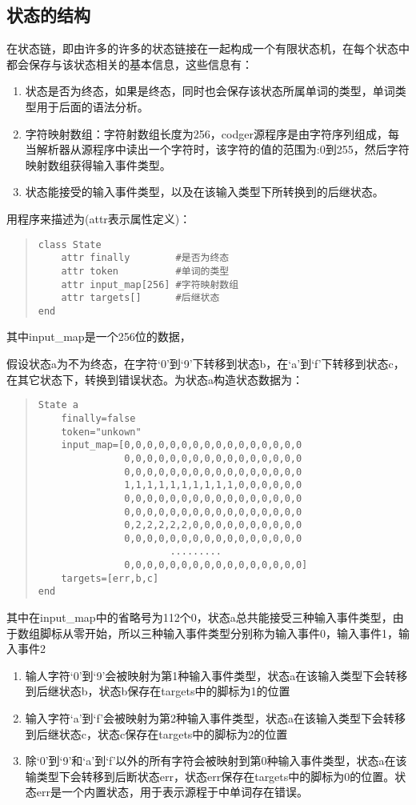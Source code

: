 \documentclass[a4paper,11pt]{article}
\begin{document}
\begin{CJK}{UTF8}{gbsn}
\subsection{状态的结构}
在状态链，即由许多的许多的状态链接在一起构成一个有限状态机，在每个状态中都会保存与该状态相关的基本信息，这些信息有：
\begin{enumerate}
 \item 状态是否为终态，如果是终态，同时也会保存该状态所属单词的类型，单词类型用于后面的语法分析。
 \item 字符映射数组：字符射数组长度为256，codger源程序是由字符序列组成，每当解析器从源程序中读出一个字符时，该字符的值的范围为:0到255，然后字符映射数组获得输入事件类型。
 \item 状态能接受的输入事件类型，以及在该输入类型下所转换到的后继状态。
\end{enumerate}
用程序来描述为(attr表示属性定义)：
\begin{quote}
 \begin{verbatim}
class State
    attr finally        #是否为终态
    attr token          #单词的类型
    attr input_map[256] #字符映射数组
    attr targets[]      #后继状态
end
 \end{verbatim}
\end{quote}
其中input\_map是一个256位的数据，

假设状态a为不为终态，在字符`0'到`9'下转移到状态b，在`a'到`f'下转移到状态c，在其它状态下，转换到错误状态。为状态a构造状态数据为：
\begin{quote}
 \begin{verbatim}
State a
    finally=false
    token="unkown"
    input_map=[0,0,0,0,0,0,0,0,0,0,0,0,0,0,0,0
               0,0,0,0,0,0,0,0,0,0,0,0,0,0,0,0
               0,0,0,0,0,0,0,0,0,0,0,0,0,0,0,0
               1,1,1,1,1,1,1,1,1,1,0,0,0,0,0,0
               0,0,0,0,0,0,0,0,0,0,0,0,0,0,0,0
               0,0,0,0,0,0,0,0,0,0,0,0,0,0,0,0
               0,2,2,2,2,2,0,0,0,0,0,0,0,0,0,0
               0,0,0,0,0,0,0,0,0,0,0,0,0,0,0,0
                       .........
               0,0,0,0,0,0,0,0,0,0,0,0,0,0,0,0]
    targets=[err,b,c]
end  
 \end{verbatim}
\end{quote}
其中在input\_map中的省略号为112个0，状态a总共能接受三种输入事件类型，由于数组脚标从零开始，所以三种输入事件类型分别称为输入事件0，输入事件1，输入事件2
\begin{enumerate}
 \item 输人字符`0'到`9'会被映射为第1种输入事件类型，状态a在该输入类型下会转移到后继状态b，状态b保存在targets中的脚标为1的位置
 \item 输入字符`a'到`f'会被映射为第2种输入事件类型，状态a在该输入类型下会转移到后继状态c，状态c保存在targets中的脚标为2的位置
 \item 除`0'到`9'和`a'到`f'以外的所有字符会被映射到第0种输入事件类型，状态a在该输类型下会转移到后断状态err，状态err保存在targets中的脚标为0的位置。状态err是一个内置状态，用于表示源程于中单词存在错误。
\end{enumerate}

\end{CJK}
\end{document}
